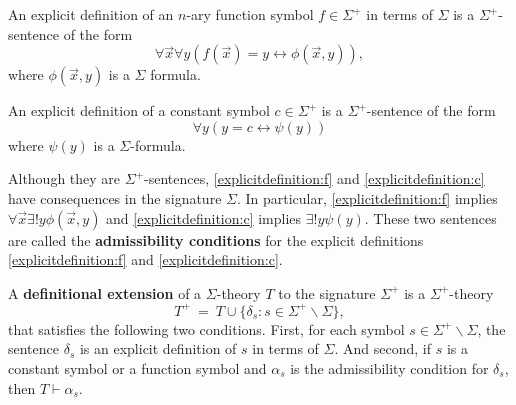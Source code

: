 \begin{defn} An explicit definition of an $n$-ary function symbol
  $f\in\Sigma^+$ in terms of $\Sigma$ is a $\Sigma^+$-sentence of the
  form
\begin{equation}
\label{explicitdefinition:f}
\forall \vec{x}\forall y (f(\vec{x})=y\leftrightarrow\phi(\vec{x},y)) , \end{equation}
where $\phi(\vec{x},y)$ is a $\Sigma$ formula.  \end{defn}

\begin{defn} An explicit definition of a constant symbol
  $c\in\Sigma^+$ is a $\Sigma^+$-sentence of the form
  \begin{equation}
\label{explicitdefinition:c}
\forall y (y=c\leftrightarrow\psi(y))
\end{equation}
where $\psi(y)$ is a $\Sigma$-formula. \end{defn}

Although they are $\Sigma^+$-sentences, \eqref{explicitdefinition:f}
and \eqref{explicitdefinition:c} have consequences in the signature
$\Sigma$. In particular, \eqref{explicitdefinition:f} implies
$\forall \vec{x}\exists !y\phi(\vec{x},y)$ and
\eqref{explicitdefinition:c} implies $\exists ! y\psi(y)$.  These two
sentences are called the \textbf{admissibility conditions} for the
explicit definitions \eqref{explicitdefinition:f} and
\eqref{explicitdefinition:c}.

\begin{defn} A \textbf{definitional extension} of a $\Sigma$-theory
  $T$ to the signature $\Sigma^+$ is a $\Sigma^+$-theory
  \[ T^+ \: = \: T\cup\{\delta_s:s\in\Sigma^+\backslash\Sigma\}, \]
  that satisfies the following two conditions. First, for each symbol
  $s\in\Sigma^+\backslash\Sigma$, the sentence $\delta_s$ is an
  explicit definition of $s$ in terms of $\Sigma$. And second, if $s$
  is a constant symbol or a function symbol and $\alpha_s$ is the
  admissibility condition for $\delta_s$, then
  $T\vdash\alpha_s$. \end{defn}

